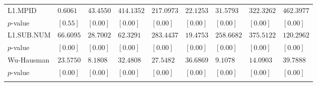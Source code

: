 \documentclass{article}
\begin{document}
\begin{table}[]
{\begin{tabular}{lllllllll}
L1.MPID & $0.6061$  & $43.4550$ & $414.1352$ & $217.0973$ & $22.1253$ & $31.5793$  & $322.3262$ & $462.3977$ \\
$p$-value                  & $[0.55]$  & $[0.00]$  & $[0.00]$   & $[0.00]$   & $[0.00]$  & $[0.00]$   & $[0.00]$   & $[0.00]$   \\
L1.SUB.NUM            & $66.6095$ & $28.7002$ & $62.3291$  & $283.4437$ & $19.4753$ & $258.6682$ & $375.5122$ & $120.2962$ \\
$p$-value                 & $[0.00]$  & $[0.00]$  & $[0.00]$   & $[0.00]$   & $[0.00]$  & $[0.00]$   & $[0.00]$   & $[0.00]$   \\
Wu-Hausman           & $23.5750$ & $8.1808$  & $32.4808$  & $27.5482$  & $36.6869$ & $9.1078$   & $14.0903$  & $39.7888$  \\
$p$-value                 & $[0.00]$  & $[0.00]$  & $[0.00]$   & $[0.00]$   & $[0.00]$  & $[0.00]$   & $[0.00]$   & $[0.00]$  \\ \\ \hline
\end{tabular}}
\end{table}
\end{document}
